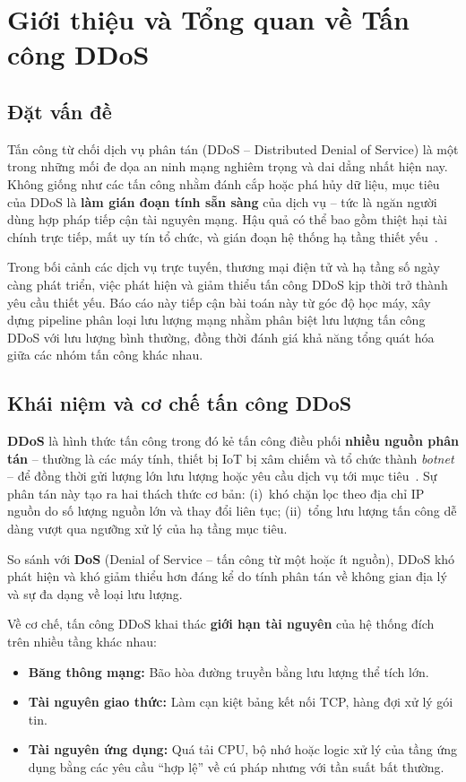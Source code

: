 \section{Giới thiệu và Tổng quan về Tấn công DDoS}
\label{sec:gioi-thieu}

\subsection{Đặt vấn đề}

Tấn công từ chối dịch vụ phân tán (DDoS -- Distributed Denial of Service) là một trong những mối đe dọa an ninh mạng nghiêm trọng và dai dẳng nhất hiện nay. Không giống như các tấn công nhằm đánh cắp hoặc phá hủy dữ liệu, mục tiêu của DDoS là \textbf{làm gián đoạn tính sẵn sàng} của dịch vụ -- tức là ngăn người dùng hợp pháp tiếp cận tài nguyên mạng. Hậu quả có thể bao gồm thiệt hại tài chính trực tiếp, mất uy tín tổ chức, và gián đoạn hệ thống hạ tầng thiết yếu~\cite{mirkovic2004taxonomy}.

Trong bối cảnh các dịch vụ trực tuyến, thương mại điện tử và hạ tầng số ngày càng phát triển, việc phát hiện và giảm thiểu tấn công DDoS kịp thời trở thành yêu cầu thiết yếu. Báo cáo này tiếp cận bài toán này từ góc độ học máy, xây dựng pipeline phân loại lưu lượng mạng nhằm phân biệt lưu lượng tấn công DDoS với lưu lượng bình thường, đồng thời đánh giá khả năng tổng quát hóa giữa các nhóm tấn công khác nhau.

\subsection{Khái niệm và cơ chế tấn công DDoS}

\textbf{DDoS} là hình thức tấn công trong đó kẻ tấn công điều phối \textbf{nhiều nguồn phân tán} -- thường là các máy tính, thiết bị IoT bị xâm chiếm và tổ chức thành \textit{botnet} -- để đồng thời gửi lượng lớn lưu lượng hoặc yêu cầu dịch vụ tới mục tiêu~\cite{mirkovic2004taxonomy}. Sự phân tán này tạo ra hai thách thức cơ bản: (i)~khó chặn lọc theo địa chỉ IP nguồn do số lượng nguồn lớn và thay đổi liên tục; (ii)~tổng lưu lượng tấn công dễ dàng vượt qua ngưỡng xử lý của hạ tầng mục tiêu.

So sánh với \textbf{DoS} (Denial of Service -- tấn công từ một hoặc ít nguồn), DDoS khó phát hiện và khó giảm thiểu hơn đáng kể do tính phân tán về không gian địa lý và sự đa dạng về loại lưu lượng.

Về cơ chế, tấn công DDoS khai thác \textbf{giới hạn tài nguyên} của hệ thống đích trên nhiều tầng khác nhau:
\begin{itemize}
    \item \textbf{Băng thông mạng:} Bão hòa đường truyền bằng lưu lượng thể tích lớn.
    \item \textbf{Tài nguyên giao thức:} Làm cạn kiệt bảng kết nối TCP, hàng đợi xử lý gói tin.
    \item \textbf{Tài nguyên ứng dụng:} Quá tải CPU, bộ nhớ hoặc logic xử lý của tầng ứng dụng bằng các yêu cầu ``hợp lệ'' về cú pháp nhưng với tần suất bất thường.
\end{itemize}

